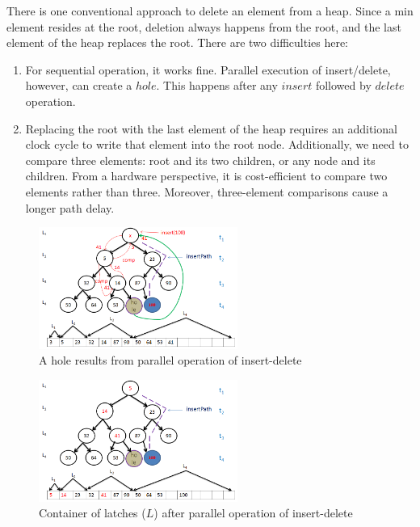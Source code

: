 \documentclass[10pt, conference, compsocconf]{IEEEtran}
\begin{document}
There is one conventional approach to delete an element from a heap.
Since a min element resides at the root, deletion always happens from the root, and the last element of the heap replaces the root. There are two difficulties here:

\begin{enumerate}
\item For sequential operation, it works fine. Parallel execution of insert/delete, however, can create a $hole$. This happens after any $insert$ followed by $delete$ operation.
\item Replacing the root with the last element of the heap requires an additional clock cycle to write that element into the root node. Additionally, we need to compare three elements: root and its two children, or any node and its children. From a hardware perspective, it is cost-efficient to compare two elements rather than three. Moreover, three-element comparisons cause a longer path delay.
\end{enumerate}


\begin{figure}[!ht]
  \centering
  \includegraphics[width=6.5cm]{Figures/8.png}
      \caption{A hole results from parallel operation of insert-delete}
    \label{fig8}
\end{figure}

\begin{figure}[!ht]
  \centering
  \includegraphics[width=6.5cm]{Figures/9.png}
      \caption{Container of latches ($L$) after parallel operation of insert-delete}
    \label{fig9}
\end{figure}
\end{document}
